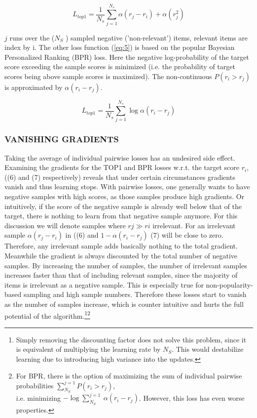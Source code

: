 \begin{equation}\label{eq:4}
    L_{top1} =  \frac{1}{N_s}  \sum_{j=1}^{N_s} \alpha (r_j - r_i) + \alpha (r^{2}_{j})
\end{equation}

$j$ runs over the ($N_S$ ) sampled negative (’non-relevant’) items, relevant items are index by i. The other loss function (\ref{eq:5}) is based on the popular Bayesian Personalized Ranking (BPR) \cite{rendle2012bpr} loss. Here the negative log-probability of the target score exceeding the sample scores is minimized (i.e. the probability of target scores being above sample scores is maximized). The non-continuous $P (r_i > r_j )$ is approximated by $\alpha(r_i − r_j ).$

\begin{equation}\label{eq:5}
    L_{top1} =  \frac{1}{N_s}  \sum_{j=1}^{N_s} \log \alpha(r_i - r_j)
\end{equation}


\subsubsection{VANISHING GRADIENTS}
Taking the average of individual pairwise losses has an undesired side effect. Examining the gradients for the TOP1 and BPR losses w.r.t. the target score $r_i$, ((6) and (7) respectively) reveals that
under certain circumstances gradients vanish and thus learning stops. With pairwise losses, one
generally wants to have negative samples with high scores, as those samples produce high gradients.
Or intuitively, if the score of the negative sample is already well below that of the target, there is
nothing to learn from that negative sample anymore. For this discussion we will denote samples
where $rj \gg ri$
irrelevant. For an irrelevant sample $\alpha(r_j − r_i)$ in ((6) and $1 − \alpha(r_i − r_j )$ (7) will be close to zero. Therefore, any irrelevant sample adds basically nothing to the total gradient.
Meanwhile the gradient is always discounted by the total number of negative samples. By increasing the number of samples, the number of irrelevant samples increases faster than that of including
relevant samples, since the majority of items is irrelevant as a negative sample. This is especially
true for non-popularity-based sampling and high sample numbers. Therefore these losses start to
vanish as the number of samples increase, which is counter intuitive and hurts the full potential of
the algorithm.\footnote[5]{Simply removing the discounting factor does not solve this problem, since it is equivalent of multiplying the learning rate by $N_S$. This would destabilize learning due to introducing high variance into the updates.}\footnote[6]{For BPR, there is the option of maximizing the sum of individual pairwise probabilities $\sum_{N_S}^{j=1}  P(r_i > r_j )$, \\
i.e. minimizing $− \log \sum_{N_S}^{j=1} \ \alpha(r_i − r_j )$. However, this loss has even worse properties.
}

